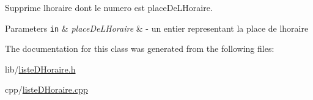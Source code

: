 Supprime l\textquotesingle{}horaire dont le numero est place\+De\+L\+Horaire. 


\begin{DoxyParams}[1]{Parameters}
\mbox{\tt in}  & {\em place\+De\+L\+Horaire} & -\/ un entier representant la place de l\textquotesingle{}horaire \\
\hline
\end{DoxyParams}


The documentation for this class was generated from the following files\+:\begin{DoxyCompactItemize}
\item 
lib/\hyperlink{liste_d_horaire_8h}{liste\+D\+Horaire.\+h}\item 
cpp/\hyperlink{liste_d_horaire_8cpp}{liste\+D\+Horaire.\+cpp}\end{DoxyCompactItemize}
